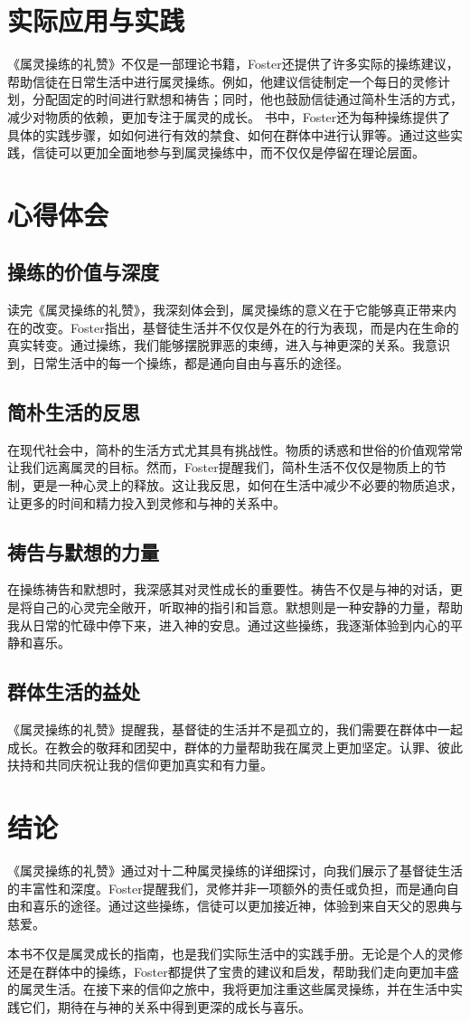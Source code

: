 \documentclass[12pt, a4paper]{ctexart}
\begin{document}
\section{实际应用与实践}
《属灵操练的礼赞》不仅是一部理论书籍，Foster还提供了许多实际的操练建议，帮助信徒在日常生活中进行属灵操练。例如，他建议信徒制定一个每日的灵修计划，分配固定的时间进行默想和祷告；同时，他也鼓励信徒通过简朴生活的方式，减少对物质的依赖，更加专注于属灵的成长。
书中，Foster还为每种操练提供了具体的实践步骤，如如何进行有效的禁食、如何在群体中进行认罪等。通过这些实践，信徒可以更加全面地参与到属灵操练中，而不仅仅是停留在理论层面。
\section{心得体会}
\subsection{操练的价值与深度}
读完《属灵操练的礼赞》，我深刻体会到，属灵操练的意义在于它能够真正带来内在的改变。Foster指出，基督徒生活并不仅仅是外在的行为表现，而是内在生命的真实转变。通过操练，我们能够摆脱罪恶的束缚，进入与神更深的关系。我意识到，日常生活中的每一个操练，都是通向自由与喜乐的途径。
\subsection{简朴生活的反思}
在现代社会中，简朴的生活方式尤其具有挑战性。物质的诱惑和世俗的价值观常常让我们远离属灵的目标。然而，Foster提醒我们，简朴生活不仅仅是物质上的节制，更是一种心灵上的释放。这让我反思，如何在生活中减少不必要的物质追求，让更多的时间和精力投入到灵修和与神的关系中。
\subsection{祷告与默想的力量}
在操练祷告和默想时，我深感其对灵性成长的重要性。祷告不仅是与神的对话，更是将自己的心灵完全敞开，听取神的指引和旨意。默想则是一种安静的力量，帮助我从日常的忙碌中停下来，进入神的安息。通过这些操练，我逐渐体验到内心的平静和喜乐。
\subsection{群体生活的益处}
《属灵操练的礼赞》提醒我，基督徒的生活并不是孤立的，我们需要在群体中一起成长。在教会的敬拜和团契中，群体的力量帮助我在属灵上更加坚定。认罪、彼此扶持和共同庆祝让我的信仰更加真实和有力量。
\section*{结论}
《属灵操练的礼赞》通过对十二种属灵操练的详细探讨，向我们展示了基督徒生活的丰富性和深度。Foster提醒我们，灵修并非一项额外的责任或负担，而是通向自由和喜乐的途径。通过这些操练，信徒可以更加接近神，体验到来自天父的恩典与慈爱。

本书不仅是属灵成长的指南，也是我们实际生活中的实践手册。无论是个人的灵修还是在群体中的操练，Foster都提供了宝贵的建议和启发，帮助我们走向更加丰盛的属灵生活。在接下来的信仰之旅中，我将更加注重这些属灵操练，并在生活中实践它们，期待在与神的关系中得到更深的成长与喜乐。
\end{document}
